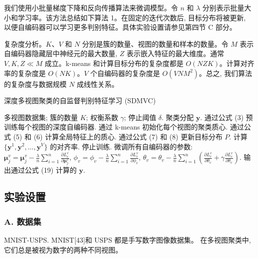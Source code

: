 \documentclass{article}
\begin{document}
我们使用小批量梯度下降和反向传播算法来微调模型。令 $n$ 和 $\lambda$ 分别表示批量大小和学习率。该方法总结如下算法 1。在固定的迭代次数后, 目标分布将被更新, 以便自编码器可以学习更多判别特征。具体实验设置请参见第四节 C 部分。

复杂度分析。$K$、$V$ 和 $N$ 分别是簇的数量、视图的数量和样本的数量。令 $M$ 表示自编码器隐藏层中神经元的最大数量, $Z$ 表示嵌入特征的最大维度。通常 $V, K, Z \ll M$ 成立。k-means 和计算目标分布的复杂度都是 $O(N Z K)$。计算对齐率的复杂度是 $O(N K)$。$V$ 个自编码器的复杂度是 $O(V N M^2)$。总之, 我们算法的复杂度与数据规模 $N$ 成线性关系。

\begin{algorithm}
    \caption{深度多视图聚类的自监督判别特征学习 (SDMVC)}
    \label{alg:SDMVC}
    \begin{algorithmic}[1]
        \REQUIRE 多视图数据集; 簇的数量 $K$; 权衡系数 $\gamma$; 停止阈值 $\delta$.
        \ENSURE 聚类分配 $\mathbf{y}$.
        \STATE 通过公式 (3) 预训练每个视图的深度自编码器.
        \STATE 通过 k-means 初始化每个视图的聚类质心.
        \STATE 通过公式 (5) 和 (6) 计算全局特征上的质心.
        \STATE 通过公式 (7) 和 (8) 更新目标分布 $P$.
        \STATE 计算 $\{\mathbf{y}^1, \mathbf{y}^2, \ldots, \mathbf{y}^V\}$ 的对齐率.
        \STATE 停止训练.
        \ENDIF
        \STATE 微调所有自编码器的参数:
        \STATE $\boldsymbol{\mu}^v_j = \boldsymbol{\mu}^v_j - \frac{\lambda}{n} \sum_{i=1}^{n} \frac{\partial L^v_c}{\partial \boldsymbol{\mu}^v_j}$,
        \STATE $\phi_v = \phi_v - \frac{\lambda}{n} \sum_{i=1}^{n} \frac{\partial L^v_r}{\partial \phi_v}$,
        \STATE $\theta_v = \theta_v - \frac{\lambda}{n} \sum_{i=1}^{n} \left( \frac{\partial L^v_r}{\partial \theta_v} + \gamma \frac{\partial L^v_c}{\partial \theta_v} \right)$.
        \ENDFOR
        \ENDWHILE
        \STATE 输出通过公式 (19) 计算的 $\mathbf{y}$.
    \end{algorithmic}
\end{algorithm}



\subsection{实验设置}

\subsubsection*{A. 数据集}
MNIST-USPS. MNIST[43]和 USPS 都是手写数字图像数据集。
在多视图聚类中, 它们总是被视为数字的两种不同视图。
\end{document}
